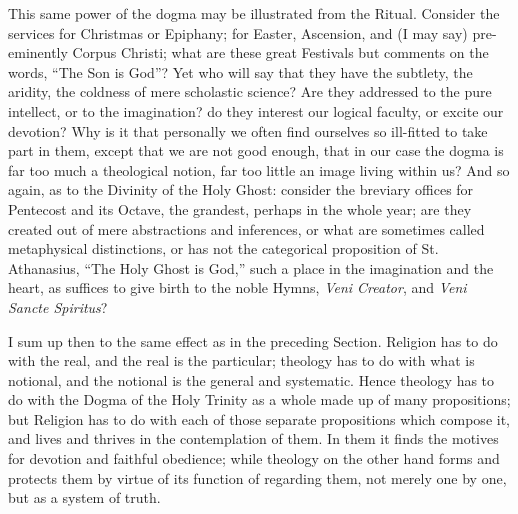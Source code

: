 This same power of the dogma may be illustrated from the Ritual.
Consider the services for Christmas or Epiphany; for Easter,
Ascension, and (I may say) pre-eminently Corpus Christi; what are
these great Festivals but comments on the words, ``The Son is
God''? Yet who will say that they have the subtlety, the aridity,
the coldness of mere scholastic science? Are they addressed to the
pure intellect, or to the imagination? do they interest our logical
faculty, or excite our devotion? Why is it that personally we often
find ourselves so ill-fitted to take part in them, except that we are
not good enough, that in our case the dogma is far too much a
theological notion, far too little an image living within us?
And so again, as to the Divinity of the Holy Ghost: consider the
breviary offices for Pentecost and its Octave, the grandest, perhaps
in the whole year; are they created out of mere abstractions and
inferences, or what are sometimes called metaphysical distinctions, or
has not the categorical proposition of St. Athanasius, ``The Holy
Ghost is God,'' such a place in the imagination and the heart, as
suffices to give birth to the noble Hymns, \emph{Veni Creator}, and \emph{Veni
Sancte Spiritus}?

I sum up then to the same effect as in the preceding Section.
Religion has to do with the real, and the real is the particular;
theology has to do with what is notional, and the notional is the
general and systematic. Hence theology has to do with the Dogma of the
Holy Trinity as a whole made up of many propositions; but Religion has
to do with each of those separate propositions which compose it, and
lives and thrives in the contemplation of them. In them it finds the
motives for devotion and faithful obedience; while theology on the
other hand forms and protects them by virtue of its function of
regarding them, not merely one by one, but as a system of truth.

